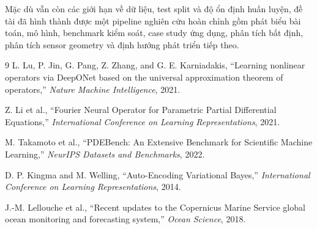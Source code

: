 \documentclass[a4paper, 12pt]{article}
\begin{document}
Mặc dù vẫn còn các giới hạn về dữ liệu, test split và độ ổn định huấn luyện, đề tài đã hình thành được một pipeline nghiên cứu hoàn chỉnh gồm phát biểu bài toán, mô hình, benchmark kiểm soát, case study ứng dụng, phân tích bất định, phân tích sensor geometry và định hướng phát triển tiếp theo.

\begin{thebibliography}{9}
L. Lu, P. Jin, G. Pang, Z. Zhang, and G. E. Karniadakis,
``Learning nonlinear operators via DeepONet based on the universal approximation theorem of operators,''
\textit{Nature Machine Intelligence}, 2021.

Z. Li et al.,
``Fourier Neural Operator for Parametric Partial Differential Equations,''
\textit{International Conference on Learning Representations}, 2021.

M. Takamoto et al.,
``PDEBench: An Extensive Benchmark for Scientific Machine Learning,''
\textit{NeurIPS Datasets and Benchmarks}, 2022.

D. P. Kingma and M. Welling,
``Auto-Encoding Variational Bayes,''
\textit{International Conference on Learning Representations}, 2014.

J.-M. Lellouche et al.,
``Recent updates to the Copernicus Marine Service global ocean monitoring and forecasting system,''
\textit{Ocean Science}, 2018.
\end{thebibliography}
\end{document}
